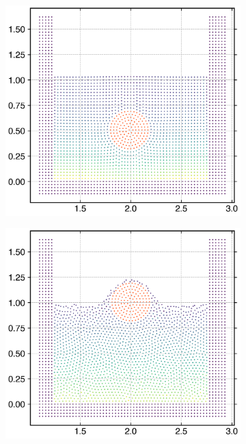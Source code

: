 \begin{figure}[!htpb]
  \centering
  \begin{subfigure}{0.48\textwidth}
    \centering
    \includegraphics[width=1.0\textwidth]{figures/rfc/figures/dinesh_2022_body_in_hs_tank_2d/time1}
  \end{subfigure}
  \begin{subfigure}{0.48\textwidth}
    \centering
    \includegraphics[width=1.0\textwidth]{figures/rfc/figures/dinesh_2022_body_in_hs_tank_2d/time4}
  \end{subfigure}


\end{figure}
